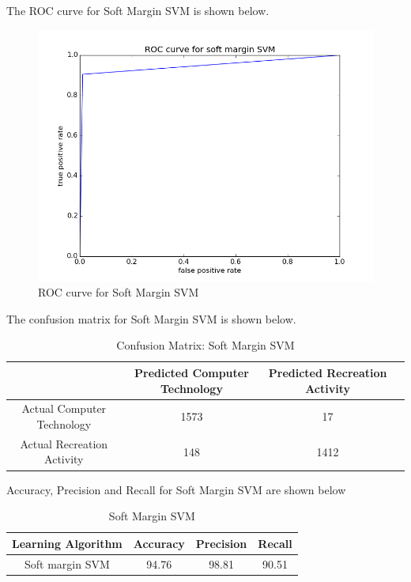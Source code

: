 \documentclass[11pt]{article}
\begin{document}
The ROC curve for Soft Margin SVM is shown below.

\begin{figure}[H]
	\centering
	\includegraphics[scale = 0.6]{ROC_SMSVM.png}
	\caption{ROC curve for Soft Margin SVM}
\end{figure}

The confusion matrix for Soft Margin SVM is shown below.

\begin{table}[H]
	\centering
	\begin{tabular}{|c|c|c|c|} \hline
		& Predicted Computer Technology & Predicted Recreation Activity \\ \hline
		Actual Computer Technology & 1573 & 17 \\
		Actual Recreation Activity & 148& 1412  \\
		\hline
	\end{tabular}
	\caption{Confusion Matrix: Soft Margin SVM}
\end{table}

Accuracy, Precision and Recall for Soft Margin SVM are shown below

\begin{table}[H]
	\centering
	\begin{tabular}{|c|c|c|c|} \hline
		Learning Algorithm & Accuracy & Precision & Recall\\ \hline
		Soft margin SVM & 94.76 & 98.81 & 90.51 \\
		\hline
	\end{tabular}
	\caption{Soft Margin SVM}
\end{table}
\end{document}
